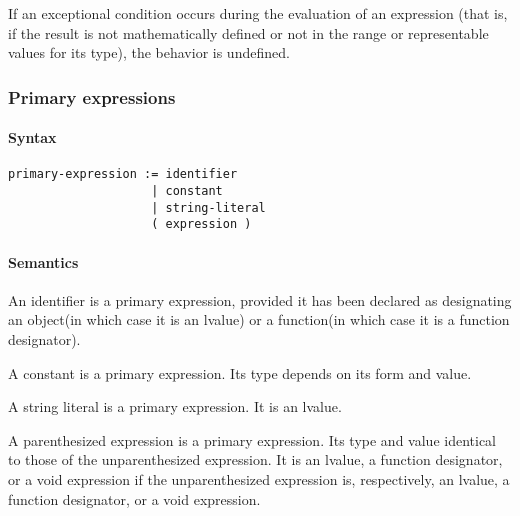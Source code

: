 \documentclass{article}
\begin{document}
If an exceptional condition occurs during the evaluation of an expression (that is, if 
the result is not mathematically defined or not in the range or representable values for 
its type), the behavior is undefined.

\subsubsection{Primary expressions}
\paragraph*{Syntax}
\begin{lstlisting}[language=bnf]
primary-expression := identifier
                    | constant
                    | string-literal
                    ( expression )
\end{lstlisting}
\paragraph*{Semantics}
An identifier is a primary expression, provided it has been declared as designating an 
object(in which case it is an lvalue) or a function(in which case it is a function 
designator).
\linebreak

A constant is a primary expression. Its type depends on its form and value.
\linebreak

A string literal is a primary expression.  It is an lvalue.
\linebreak

A parenthesized expression is a primary expression.  Its type and value identical to 
those of the unparenthesized expression.  It is an lvalue, a function designator, or a 
void expression if the unparenthesized expression is, respectively, an lvalue, a 
function designator, or a void expression.



\end{document}
